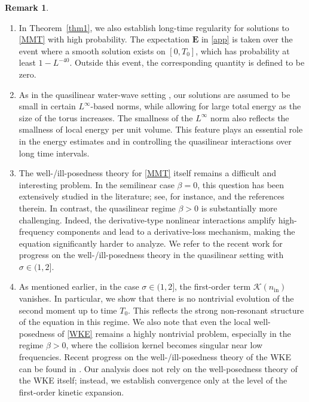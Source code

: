\documentclass[UTF-8,reqno]{amsart}
\numberwithin{equation}{section}
\theoremstyle{definition}
\newtheorem{remark}[theorem]{Remark}
\begin{document}
 

\begin{remark}
\begin{enumerate}
   
    \item  In Theorem~\ref{thm1}, we also establish long-time regularity for solutions to \eqref{MMT} with high probability. 
The expectation $\mathbf{E}$ in \eqref{app} is taken over the event where a smooth solution exists on $[0,T_0]$, 
which has probability at least $1 - L^{-40}$. 
Outside this event, the corresponding quantity is defined to be zero.
    \item As in the quasilinear water-wave setting \cite{DIP25a,DIP25}, 
our solutions are assumed to be small in certain $L^\infty$-based norms, 
while allowing for large total energy as the size of the torus increases. 
The smallness of the $L^\infty$ norm also reflects the smallness of local energy per unit volume. 
This feature plays an essential role in the energy estimates and in controlling the quasilinear interactions over long time intervals. 
  
    \item The well-/ill-posedness theory for \eqref{MMT} itself remains a difficult and interesting problem. 
In the semilinear case $\beta=0$, this question has been extensively studied in the literature; 
see, for instance, \cite{CHHO13,CHHO14,CHKL14,CHKL15,HS15,BLLZ23} and the references therein. 
In contrast, the quasilinear regime $\beta>0$ is substantially more challenging. 
Indeed, the derivative-type nonlinear interactions amplify high-frequency components and lead to a derivative-loss mechanism, making the equation significantly harder to analyze.  
We refer to the recent work \cite{PPW26} for progress on the well-/ill-posedness theory in the quasilinear setting with $\sigma\in(1,2]$. 
    \item  As mentioned earlier, in the case $\sigma \in (1,2]$, the first-order term $\mathcal{K}(n_{\mathrm{in}})$ vanishes. In particular, we show that there is no nontrivial evolution of the second moment up to time $T_0$. This reflects the strong non-resonant structure of the equation in this regime. We also note that even the local well-posedness of \eqref{WKE} remains a highly nontrivial problem, especially in the regime $\beta > 0$, where the collision kernel becomes singular near low frequencies. Recent progress on the well-/ill-posedness theory of the WKE can be found in \cite{GIK20,GLZ25,AL25}. Our analysis does not rely on the well-posedness theory of the WKE itself; instead, we establish convergence only at the level of the first-order kinetic expansion.
 
\end{enumerate}
\end{remark}
\end{document}
